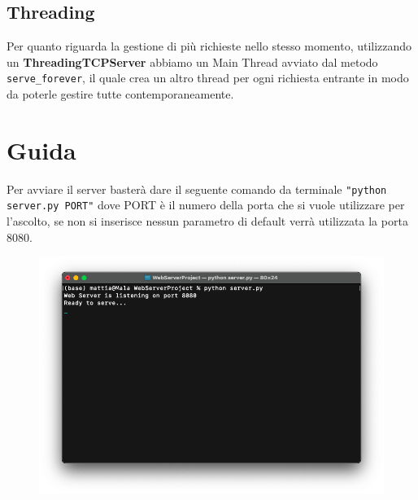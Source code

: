 \documentclass[a4paper,12pt]{report}
\begin{document}
\section{Threading}

Per quanto riguarda la gestione di più richieste nello stesso momento, utilizzando un \textbf{ThreadingTCPServer} abbiamo un Main Thread avviato dal metodo \texttt{serve\_forever}, il quale crea un altro thread per ogni richiesta entrante in modo da poterle gestire tutte contemporaneamente.


\chapter{Guida}
Per avviare il server basterà dare il seguente comando da terminale \texttt{"python server.py PORT"} dove PORT è il numero della porta che si vuole utilizzare per l’ascolto, se non si inserisce nessun parametro di default verrà utilizzata la porta 8080.


\begin{figure}[ht]
    \begin{center}
        \centering
        \includegraphics[width=\textwidth]{img/Terminale1.png}
    \end{center}
\end{figure}

\clearpage
\end{document}
